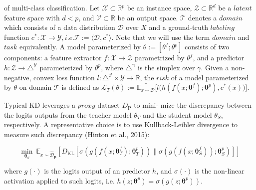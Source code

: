 of multi-class classification. Let $\mathcal{X}\subset\mathbb{R}^p$ be an instance space, $\mathcal{Z}\subset\mathbb{R}^d$ be a $latent$ feature space with $d<p$, and $\mathcal{V}\subset\mathbb{R}$ be an output space. $\mathcal{T}$ denotes a $domain$ which consists of a data distribution $\mathcal{D}$ over $X$ and a ground-truth $labeling$ function $c^*:\mathcal{X}\to\mathcal{Y},i.e.\mathcal{T}:=\langle\mathcal{D},c^*\rangle$. Note that we will use the term $domain$ and $task$ equivalently. A model parameterized by $\theta:=[\theta^f;\theta^p]$ consists of two components: a feature extractor $f:\mathcal{X}\to\mathcal{Z}$ parametrized by $\theta^f$, and a predictor $h:\mathcal{Z}\to\triangle^\mathcal{Y}$ parameterized by $\theta^p$, where $\triangle^\mathrm{\gamma}$ is the simplex over $\gamma$. Given a non-negative, convex loss function $l:\triangle^{\mathcal{Y}}\times\mathcal{Y}\to\mathbb{R}$, the $risk$ of a model parameterized by $\theta$ on domain $\mathcal{T}$ is defined as $\mathcal{L}_T(\theta):=
\bar{\mathbb{E}_{x\sim\mathcal{D}}}\big[l\big(h(f(x;\boldsymbol{\theta}^{f});\boldsymbol{\theta}^{p}),c^{*}(x)\big)\big].
$

Typical KD leverages a $proxy$ dataset $D_\mathrm{P}$ to mini- mize the discrepancy between the logits outputs from the teacher model $\theta_T$ and the student model $\theta_S$, respectively. A representative choice is to use Kullback-Leibler divergence to measure such discrepancy (Hinton et al., 2015):

\begin{equation*}
\operatorname*{\min}_{\boldsymbol{\theta}_{S}}\:\mathbb{E}_{x\sim\hat{\mathcal{D}}_{\mathbf{p}}}\left[D_{\mathrm{KL}}\left[\sigma(g(f(x;\boldsymbol{\theta}_{T}^{f});\boldsymbol{\theta}_{T}^{p}))\|\sigma(g(f(x;\boldsymbol{\theta}_{S}^{f}));\boldsymbol{\theta}_{S}^{p})\right]\right]
\end{equation*}

where $g(\cdot)$ is the logits output of an predictor $h$, and $\sigma(\cdot)$ is the non-linear activation applied to such logits, i.e. $h(z;\boldsymbol{\theta}^p)=\sigma(g(z;\boldsymbol{\theta}^p))$.
